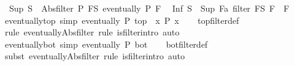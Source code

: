 \begin{isabellebody}
\isanewline
{}\isamarkupfalse%
\isanewline
\ \ {\isachardoublequoteopen}Sup\ S\ {\isacharequal}{\kern0pt}\ Abs{\isacharunderscore}{\kern0pt}filter\ {\isacharparenleft}{\kern0pt}{\isasymlambda}P{\isachardot}{\kern0pt}\ {\isasymforall}F{\isasymin}S{\isachardot}{\kern0pt}\ eventually\ P\ F{\isacharparenright}{\kern0pt}{\isachardoublequoteclose}\isanewline
\isanewline
{}\isamarkupfalse%
\isanewline
\ \ {\isachardoublequoteopen}Inf\ S\ {\isacharequal}{\kern0pt}\ Sup\ {\isacharbraceleft}{\kern0pt}F{\isacharcolon}{\kern0pt}{\isacharcolon}{\kern0pt}{\isacharprime}{\kern0pt}a\ filter{\isachardot}{\kern0pt}\ {\isasymforall}F{\isacharprime}{\kern0pt}{\isasymin}S{\isachardot}{\kern0pt}\ F\ {\isasymle}\ F{\isacharprime}{\kern0pt}{\isacharbraceright}{\kern0pt}{\isachardoublequoteclose}\isanewline
\isanewline
{}\isamarkupfalse%
\ eventually{\isacharunderscore}{\kern0pt}top\ {\isacharbrackleft}{\kern0pt}simp{\isacharbrackright}{\kern0pt}{\isacharcolon}{\kern0pt}\ {\isachardoublequoteopen}eventually\ P\ top\ {\isasymlongleftrightarrow}\ {\isacharparenleft}{\kern0pt}{\isasymforall}x{\isachardot}{\kern0pt}\ P\ x{\isacharparenright}{\kern0pt}{\isachardoublequoteclose}\isanewline
%
\isadelimproof
\ \ %
\endisadelimproof
%
\isatagproof
{}\isamarkupfalse%
\ top{\isacharunderscore}{\kern0pt}filter{\isacharunderscore}{\kern0pt}def\isanewline
\ \ \isamarkupfalse%
\ {\isacharparenleft}{\kern0pt}rule\ eventually{\isacharunderscore}{\kern0pt}Abs{\isacharunderscore}{\kern0pt}filter{\isacharcomma}{\kern0pt}\ rule\ is{\isacharunderscore}{\kern0pt}filter{\isachardot}{\kern0pt}intro{\isacharcomma}{\kern0pt}\ auto{\isacharparenright}{\kern0pt}%
\endisatagproof
{\isafoldproof}%
%
\isadelimproof
\isanewline
%
\endisadelimproof
\isanewline
{}\isamarkupfalse%
\ eventually{\isacharunderscore}{\kern0pt}bot\ {\isacharbrackleft}{\kern0pt}simp{\isacharbrackright}{\kern0pt}{\isacharcolon}{\kern0pt}\ {\isachardoublequoteopen}eventually\ P\ bot{\isachardoublequoteclose}\isanewline
%
\isadelimproof
\ \ %
\endisadelimproof
%
\isatagproof
{}\isamarkupfalse%
\ bot{\isacharunderscore}{\kern0pt}filter{\isacharunderscore}{\kern0pt}def\isanewline
\ \ \isamarkupfalse%
\ {\isacharparenleft}{\kern0pt}subst\ eventually{\isacharunderscore}{\kern0pt}Abs{\isacharunderscore}{\kern0pt}filter{\isacharcomma}{\kern0pt}\ rule\ is{\isacharunderscore}{\kern0pt}filter{\isachardot}{\kern0pt}intro{\isacharcomma}{\kern0pt}\ auto{\isacharparenright}{\kern0pt}%
\endisatagproof
{\isafoldproof}%

\end{isabellebody}
